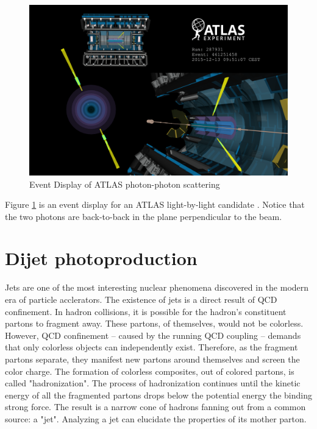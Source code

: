 \begin{figure}[h!]
\begin{centering}
\includegraphics[width=5in]{Chapter2/importfigs/light-by-light-figure_2.png}
\par\end{centering}
\caption{Event Display of ATLAS photon-photon scattering \cite{Collaboration:2278547} \label{fig:atlasEvent}}
\end{figure}

Figure \ref{fig:atlasEvent} is an event display for an ATLAS light-by-light candidate \cite{Collaboration:2278547}. Notice that the two photons are back-to-back in the plane perpendicular to the beam.

\section{Dijet photoproduction}

Jets are one of the most interesting nuclear phenomena discovered in the modern era of particle acclerators. The existence of jets is a direct result of QCD confinement. In hadron collisions, it is possible for the hadron's constituent partons to fragment away. These partons, of themselves, would not be colorless. However, QCD confinement -- caused by the running QCD coupling -- demands that only colorless objects can independently exist. Therefore, as the fragment partons separate, they manifest new partons around themselves and screen the color charge. The formation of colorless composites, out of colored partons, is called "hadronization". The process of hadronization continues until the kinetic energy of all the fragmented partons drops below the potential energy the binding strong force. The result is a narrow cone of hadrons fanning out from a common source: a "jet". Analyzing a jet can elucidate the properties of its mother parton.  

